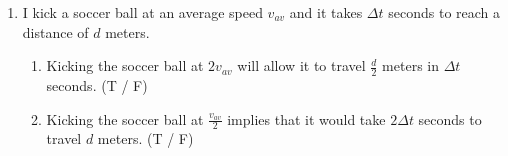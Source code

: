 \documentclass[12pt]{article} %
\begin{document}
\begin{qstn}[1]
\begin{enumerate}
		\item I kick a soccer ball at an average speed $v_{av}$ and it takes $\Delta t$ seconds to reach a distance of $d$ meters.
			\begin{enumerate}[label = (\alph*)]
				\item Kicking the soccer ball at $2v_{av}$ will allow it to travel $\frac{d}{2}$ meters in $\Delta t$ seconds. (T / F)
				\item Kicking the soccer ball at $\frac{v_{av}}{2}$ implies that it would take $2\Delta t$ seconds to travel $d$ meters. (T / F)
			\end{enumerate}
	
	\end{enumerate}

\end{qstn}
	
\end{document}
